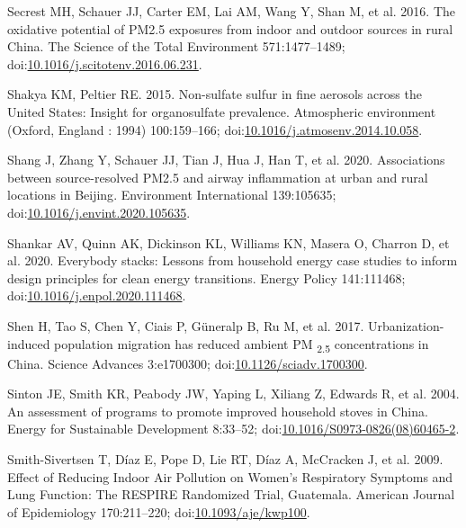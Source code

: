 \documentclass[
  letterpaper,
  DIV=11,
  numbers=noendperiod]{scrartcl}
\newlength{\cslhangindent}
\newenvironment{CSLReferences}[2] %
 {\begin{list}{}{%
  \setlength{\itemindent}{0pt}
  \setlength{\leftmargin}{0pt}
  \setlength{\parsep}{0pt}
  \ifodd #1
   \setlength{\leftmargin}{\cslhangindent}
   \setlength{\itemindent}{-1\cslhangindent}
  \fi
  \setlength{\itemsep}{#2\baselineskip}}}
 {\end{list}}
\begin{document}
\begin{CSLReferences}{1}{1}
Secrest MH, Schauer JJ, Carter EM, Lai AM, Wang Y, Shan M, et al. 2016.
The oxidative potential of {PM2}.5 exposures from indoor and outdoor
sources in rural {China}. The Science of the Total Environment
571:1477--1489;
doi:\href{https://doi.org/10.1016/j.scitotenv.2016.06.231}{10.1016/j.scitotenv.2016.06.231}.

Shakya KM, Peltier RE. 2015. Non-sulfate sulfur in fine aerosols across
the {United States}: {Insight} for organosulfate prevalence. Atmospheric
environment (Oxford, England : 1994) 100:159--166;
doi:\href{https://doi.org/10.1016/j.atmosenv.2014.10.058}{10.1016/j.atmosenv.2014.10.058}.

Shang J, Zhang Y, Schauer JJ, Tian J, Hua J, Han T, et al. 2020.
Associations between source-resolved {PM2}.5 and airway inflammation at
urban and rural locations in {Beijing}. Environment International
139:105635;
doi:\href{https://doi.org/10.1016/j.envint.2020.105635}{10.1016/j.envint.2020.105635}.

Shankar AV, Quinn AK, Dickinson KL, Williams KN, Masera O, Charron D, et
al. 2020. Everybody stacks: {Lessons} from household energy case studies
to inform design principles for clean energy transitions. Energy Policy
141:111468;
doi:\href{https://doi.org/10.1016/j.enpol.2020.111468}{10.1016/j.enpol.2020.111468}.

Shen H, Tao S, Chen Y, Ciais P, Güneralp B, Ru M, et al. 2017.
Urbanization-induced population migration has reduced ambient {PM}
{\textsubscript{2.5}} concentrations in {China}. Science Advances
3:e1700300;
doi:\href{https://doi.org/10.1126/sciadv.1700300}{10.1126/sciadv.1700300}.

Sinton JE, Smith KR, Peabody JW, Yaping L, Xiliang Z, Edwards R, et al.
2004. An assessment of programs to promote improved household stoves in
{China}. Energy for Sustainable Development 8:33--52;
doi:\href{https://doi.org/10.1016/S0973-0826(08)60465-2}{10.1016/S0973-0826(08)60465-2}.

Smith-Sivertsen T, Díaz E, Pope D, Lie RT, Díaz A, McCracken J, et al.
2009. Effect of {Reducing Indoor Air Pollution} on {Women}'s
{Respiratory Symptoms} and {Lung Function}: {The RESPIRE Randomized
Trial}, {Guatemala}. American Journal of Epidemiology 170:211--220;
doi:\href{https://doi.org/10.1093/aje/kwp100}{10.1093/aje/kwp100}.


\end{CSLReferences}
\end{document}
